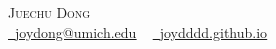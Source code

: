 \begin{center}
    {\Huge\scshape Juechu Dong} 
    \\ 
    \vspace{5pt}
    \small
    \href{mailto:EMAIL}{\raisebox{-0.2\height}\faEnvelope\  \underline{joydong@umich.edu}} ~ 
    \href{https://joydddd.github.io}{\raisebox{-0.2\height}\faGithub\ \underline{joydddd.github.io}}
\end{center}